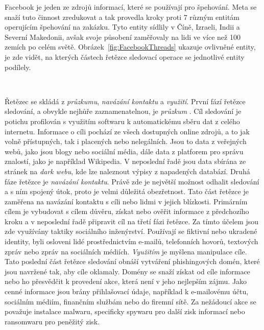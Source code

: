 Facebook je jeden ze zdrojů informací, které se používají pro špehování.
Meta se snaží tuto činnost zredukovat a tak provedla kroky proti 7 různým entitám operujícím špehování na zakázku.
Tyto entity sídlily v Číně, Izraeli, Indii a Severní Makedonii, avšak svoje působení zaměřovaly na lidi ve více než 100 zemích po celém světě.
Obrázek~\ref{fig:FacebookThreads} ukazuje ovlivněné entity, je zde vidět, na kterých částech řetězce sledovací operace se jednotlivé entity podílely.

~

Řetězec se skládá z \textit{průzkumu}, \textit{navázání kontaktu} a \textit{využití}.
První fází řetězce sledování, a obvykle nejhůře zaznamenatelnou, je \textit{průzkum} .
Cíl sledování je potichu profilován s využitím softwaru k automatickému sběru dat z celého internetu.
Informace o cíli pochází ze všech dostupných online zdrojů, a to jak volně přístupných, tak i placených nebo nelegálních.
Jsou to data z veřejných webů, jako jsou blogy nebo sociální média, dále data z platforem pro správu znalostí, jako je například Wikipedia.
V neposlední řadě jsou data sbírána ze stránek na \textit{dark webu}, kde lze naleznout výpisy z napadených databází.
Druhá fáze řetězce je \textit{navázání kontaktu}.
Právě zde je největší možnost odhalit sledování a s ním spojený útok, proto je velmi důležitá obezřetnost.
Tato část řetězce je zaměřena na navázání kontaktu s cíli nebo lidmi v jejich blízkosti.
Primárním cílem je vybudovat s cílem důvěru, získat nebo ověřit informace z předchozího kroku a v neposlední řadě připravit cíl na třetí fázi řetězce.
Za tímto účelem jsou zde využívány taktiky sociálního inženýrství.
Používají se fiktivní nebo ukradené identity, byli osloveni lidé prostřednictvím e-mailů, telefonních hovorů, textových zpráv nebo zpráv na sociálních médiích.
\textit{Využitím} je myšlena manipulace cíle.
Tato poslední část řetězce sledování obnáší vytváření phishingových domén, které jsou navržené tak, aby cíle oklamaly.
Domény se snaží získat od cíle informace nebo ho přesvědčit k provedení akce, která není v jeho nejlepším zájmu.
Jako cenné informace jsou brány přihlašovací údaje, například k e-mailovému účtu, sociálním médiím, finančním službám nebo do firemní sítě.
Za nežádoucí akce se považuje instalace malwaru, specificky spywaru pro další zisk informací nebo ransomwaru pro peněžitý zisk.\cite{pegasus_facebook}

